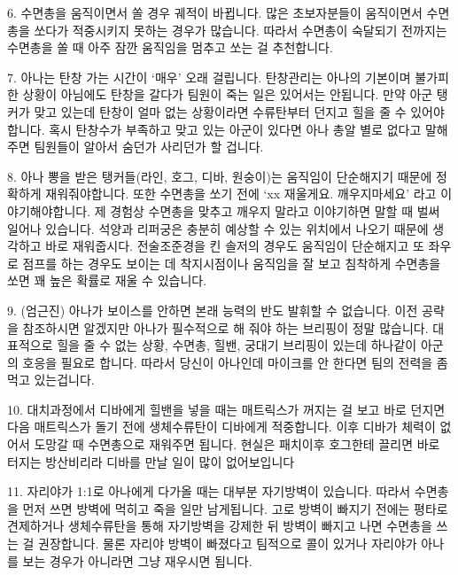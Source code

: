  



6. 수면총을 움직이면서 쏠 경우 궤적이 바뀝니다. 많은 초보자분들이 움직이면서 수면총을 쏘다가 적중시키지 못하는 경우가 많습니다. 따라서 수면총이 숙달되기 전까지는 수면총을 쏠 때 아주 잠깐 움직임을 멈추고 쏘는 걸 추천합니다.

 



7. 아나는 탄창 가는 시간이 ‘매우’ 오래 걸립니다. 탄창관리는 아나의 기본이며 불가피한 상황이 아님에도 탄창을 갈다가 팀원이 죽는 일은 있어서는 안됩니다. 만약 아군 탱커가 맞고 있는데 탄창이 얼마 없는 상황이라면 수류탄부터 던지고 힐을 줄 수 있어야 합니다. 혹시 탄창수가 부족하고 맞고 있는 아군이 있다면 아나 총알 별로 없다고 말해주면 팀원들이 알아서 숨던가 사리던가 할 겁니다.

 



8. 아나 뽕을 받은 탱커들(라인, 호그, 디바, 원숭이)는 움직임이 단순해지기 때문에 정확하게 재워줘야합니다. 또한 수면총을 쏘기 전에 ‘xx 재울게요. 깨우지마세요’ 라고 이야기해야합니다. 제 경험상 수면총을 맞추고 깨우지 말라고 이야기하면 말할 때 벌써 일어나 있습니다. 석양과 리퍼궁은 충분히 예상할 수 있는 위치에서 나오기 때문에 생각하고 바로 재워줍시다. 전술조준경을 킨 솔저의 경우도 움직임이 단순해지고 또 좌우로 점프를 하는 경우도 보이는 데 착지시점이나 움직임을 잘 보고 침착하게 수면총을 쏘면 꽤 높은 확률로 재울 수 있습니다.

 



9. (엄근진) 아나가 보이스를 안하면 본래 능력의 반도 발휘할 수 없습니다. 이전 공략을 참조하시면 알겠지만 아나가 필수적으로 해 줘야 하는 브리핑이 정말 많습니다. 대표적으로 힐을 줄 수 없는 상황, 수면총, 힐밴, 궁대기 브리핑이 있는데 하나같이 아군의 호응을 필요로 합니다. 따라서 당신이 아나인데 마이크를 안 한다면 팀의 전력을 좀먹고 있는겁니다.

 

 

10. 대치과정에서 디바에게 힐밴을 넣을 때는 매트릭스가 꺼지는 걸 보고 바로 던지면 다음 매트릭스가 돌기 전에 생체수류탄이 디바에게 적중합니다. 이후 디바가 체력이 없어서 도망갈 때 수면총으로 재워주면 됩니다. 현실은 패치이후 호그한테 끌리면 바로 터지는 방산비리라 디바를 만날 일이 많이 없어보입니다

 



11. 자리야가 1:1로 아나에게 다가올 때는 대부분 자기방벽이 있습니다. 따라서 수면총을 먼저 쓰면 방벽에 먹히고 죽을 일만 남게됩니다. 고로 방벽이 빠지기 전에는 평타로 견제하거나 생체수류탄을 통해 자기방벽을 강제한 뒤 방벽이 빠지고 나면 수면총을 쓰는 걸 권장합니다. 물론 자리야 방벽이 빠졌다고 팀적으로 콜이 있거나 자리야가 아나를 보는 경우가 아니라면 그냥 재우시면 됩니다.

